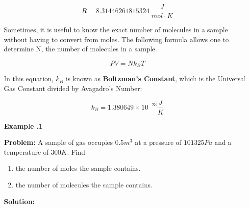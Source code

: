 	\begin{mdframed}[backgroundcolor=green!20!white]
	\begin{equation*}
		R = \SI{8.31446261815324}{\frac{J}{mol\cdot K}}
		\label{constant:universalgas}
	\end{equation*}
\end{mdframed}	


Sometimes, it is useful to know the exact number of molecules in a sample without having to convert from moles.  The following formula allows one to determine N, the number of molecules in a sample.
	
		\begin{mdframed}[backgroundcolor=orange!20!white]
		\begin{equation}
			PV = N k_BT
			\label{equation:universalgaslawkb}
		\end{equation}
	\end{mdframed}

In this equation, $k_B$ is known as \textbf{Boltzman's Constant}, which is the Universal Gas Constant divided by Avagadro's Number:


	\begin{mdframed}[backgroundcolor=green!20!white]
	\begin{equation*}
		k_B = 1.380649 \times 10^{-23}\si{\frac{J}{K}}
		\label{constant:boltzman}
	\end{equation*}
\end{mdframed}		
	
\begin{mdframed}[backgroundcolor=blue!10!white]
	\begin{center}
		
		
		\textbf{Example \thesection.1}	
	\end{center}
	
	\textbf{Problem: } A sample of gas occupies $0.5 \si{m^3}$ at a pressure of $101325 \si{Pa}$ and a temperature of $300 \si{K}$.  Find
	\begin{enumerate}
		\item the number of moles the sample contains.
		\item the number of molecules the sample contains.
	\end{enumerate}
	
	
	\vspace{0.1in}
	
	\textbf{Solution:} 

\end{mdframed}	
	
	
	
